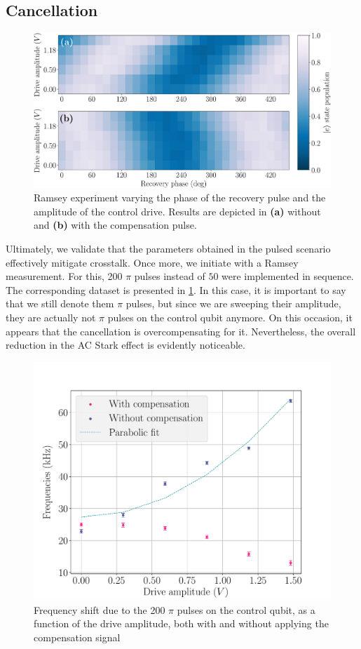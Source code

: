 \subsection{Cancellation}

\begin{figure}
    \centering
    \includegraphics[width=1\linewidth]{Images//Chap2.0/Ramsey_cancellatoin_pulsed.pdf}
    \caption{Ramsey experiment varying the phase of the recovery pulse and the amplitude of the control drive. Results are depicted in \textbf{(a)} without and \textbf{(b)} with the compensation pulse.}
    \label{fig:RAMSEY_can_pulsed}
\end{figure}

Ultimately, we validate that the parameters obtained in the pulsed scenario effectively mitigate crosstalk.
Once more, we initiate with a Ramsey measurement.
For this, 200 $\pi$ pulses instead of $50$ were implemented in sequence.
The corresponding dataset is presented in \cref{fig:RAMSEY_can_pulsed}.
In this case, it is important to say that we still denote them $\pi$ pulses, but since we are sweeping their amplitude, they are actually not $\pi$ pulses on the control qubit anymore.
On this occasion, it appears that the cancellation is overcompensating for it. 
Nevertheless, the overall reduction in the AC Stark effect is evidently noticeable.

\begin{figure}[t!]
    \centering
    \includegraphics[width=0.75\linewidth]{Images//Chap2.0/frequencies_200.pdf}
    \caption{Frequency shift due to the 200 $\pi$ pulses on the control qubit, as a function of the drive amplitude, both with and without applying the compensation signal}
    \label{fig:Freq_pulsed}
\end{figure}

